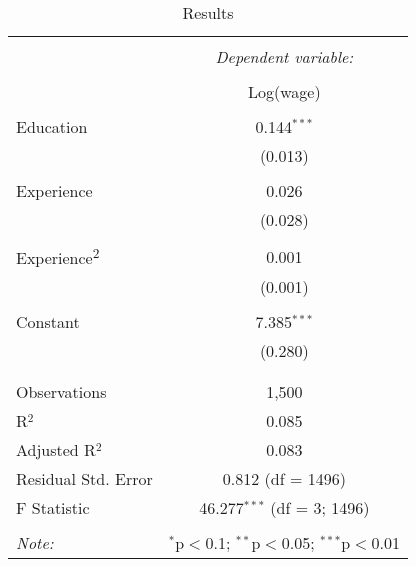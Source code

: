 
\begin{table}[!htbp] \centering 
  \caption{Results} 
  \label{tab:question-5-a} 
\begin{tabular}{@{\extracolsep{5pt}}lc} 
\\[-1.8ex]\hline 
\hline \\[-1.8ex] 
 & \multicolumn{1}{c}{\textit{Dependent variable:}} \\ 
\cline{2-2} 
\\[-1.8ex] & Log(wage) \\ 
\hline \\[-1.8ex] 
 Education & 0.144$^{***}$ \\ 
  & (0.013) \\ 
  & \\ 
 Experience & 0.026 \\ 
  & (0.028) \\ 
  & \\ 
 Experience\textsuperscript{2} & 0.001 \\ 
  & (0.001) \\ 
  & \\ 
 Constant & 7.385$^{***}$ \\ 
  & (0.280) \\ 
  & \\ 
\hline \\[-1.8ex] 
Observations & 1,500 \\ 
R$^{2}$ & 0.085 \\ 
Adjusted R$^{2}$ & 0.083 \\ 
Residual Std. Error & 0.812 (df = 1496) \\ 
F Statistic & 46.277$^{***}$ (df = 3; 1496) \\ 
\hline 
\hline \\[-1.8ex] 
\textit{Note:}  & \multicolumn{1}{r}{$^{*}$p$<$0.1; $^{**}$p$<$0.05; $^{***}$p$<$0.01} \\ 
\end{tabular} 
\end{table} 
